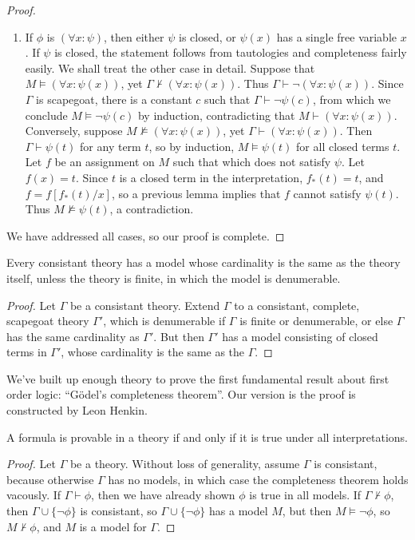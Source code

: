 \begin{proof}
\begin{enumerate}
        \item If $\phi$ is $(\forall x: \psi)$, then either $\psi$ is closed, or $\psi(x)$ has a single free variable $x$. If $\psi$ is closed, the statement follows from tautologies and completeness fairly easily. We shall treat the other case in detail. Suppose that $M \vDash (\forall x: \psi(x))$, yet $\Gamma \not \vdash (\forall x: \psi(x))$. Thus $\Gamma \vdash \neg (\forall x: \psi(x))$. Since $\Gamma$ is scapegoat, there is a constant $c$ such that $\Gamma \vdash \neg \psi(c)$, from which we conclude $M \vDash \neg \psi(c)$ by induction, contradicting that $M \vdash (\forall x: \psi(x))$. Conversely, suppose $M \not \vDash (\forall x: \psi(x))$, yet $\Gamma \vdash (\forall x: \psi(x))$. Then $\Gamma \vdash \psi(t)$ for any term $t$, so by induction, $M \vDash \psi(t)$ for all closed terms $t$. Let $f$ be an assignment on $M$ such that which does not satisfy $\psi$. Let $f(x) = t$. Since $t$ is a closed term in the interpretation, $f_*(t) = t$, and $f = f[f_*(t)/x]$, so a previous lemma implies that $f$ cannot satisfy $\psi(t)$. Thus $M \not \vDash \psi(t)$, a contradiction.
    \end{enumerate}
    We have addressed all cases, so our proof is complete.
\end{proof}

\begin{theorem}
    Every consistant theory has a model whose cardinality is the same as the theory itself, unless the theory is finite, in which the model is denumerable.
\end{theorem}
\begin{proof}
    Let $\Gamma$ be a consistant theory. Extend $\Gamma$ to a consistant, complete, scapegoat theory $\Gamma'$, which is denumerable if $\Gamma$ is finite or denumerable, or else $\Gamma$ has the same cardinality as $\Gamma'$. But then $\Gamma'$ has a model consisting of closed terms in $\Gamma'$, whose cardinality is the same as the $\Gamma$.
\end{proof}

We've built up enough theory to prove the first fundamental result about first order logic: ``G\"{o}del's completeness theorem''. Our version is the proof is constructed by Leon Henkin.

\begin{theorem}[G\"{o}del]
    A formula is provable in a theory if and only if it is true under all interpretations.
\end{theorem}
\begin{proof}
    Let $\Gamma$ be a theory. Without loss of generality, assume $\Gamma$ is consistant, because otherwise $\Gamma$ has no models, in which case the completeness theorem holds vacously. If $\Gamma \vdash \phi$, then we have already shown $\phi$ is true in all models. If $\Gamma \not \vdash \phi$, then $\Gamma \cup \{ \neg \phi \}$ is consistant, so $\Gamma \cup \{ \neg \phi \}$ has a model $M$, but then $M \vDash \neg \phi$, so $M \not \vdash \phi$, and $M$ is a model for $\Gamma$.
\end{proof}

